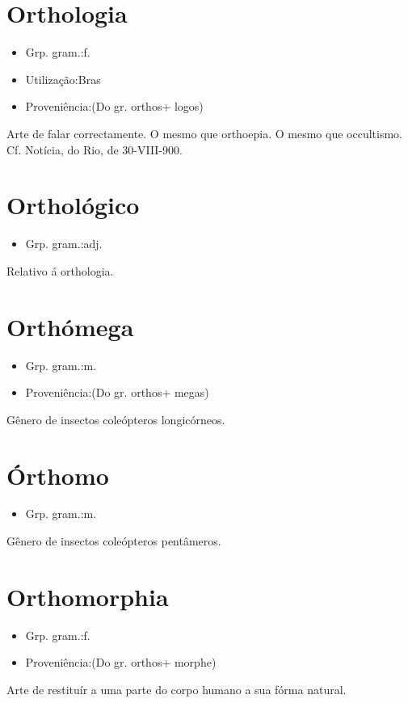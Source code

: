 \section{Orthologia}
\begin{itemize}
\item {Grp. gram.:f.}
\end{itemize}
\begin{itemize}
\item {Utilização:Bras}
\end{itemize}
\begin{itemize}
\item {Proveniência:(Do gr. \textunderscore orthos\textunderscore  + \textunderscore logos\textunderscore )}
\end{itemize}
Arte de falar correctamente.
O mesmo que \textunderscore orthoepia\textunderscore .
O mesmo que \textunderscore occultismo\textunderscore . Cf. \textunderscore Notícia\textunderscore , do Rio, de 30-VIII-900.
\section{Orthológico}
\begin{itemize}
\item {Grp. gram.:adj.}
\end{itemize}
Relativo á orthologia.
\section{Orthómega}
\begin{itemize}
\item {Grp. gram.:m.}
\end{itemize}
\begin{itemize}
\item {Proveniência:(Do gr. \textunderscore orthos\textunderscore  + \textunderscore megas\textunderscore )}
\end{itemize}
Gênero de insectos coleópteros longicórneos.
\section{Órthomo}
\begin{itemize}
\item {Grp. gram.:m.}
\end{itemize}
Gênero de insectos coleópteros pentâmeros.
\section{Orthomorphia}
\begin{itemize}
\item {Grp. gram.:f.}
\end{itemize}
\begin{itemize}
\item {Proveniência:(Do gr. \textunderscore orthos\textunderscore  + \textunderscore morphe\textunderscore )}
\end{itemize}
Arte de restituír a uma parte do corpo humano a sua fórma natural.

